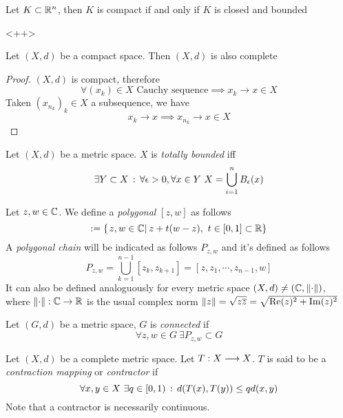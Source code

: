 \documentclass[../complete.tex]{subfiles}
\begin{document}
\begin{thm}
	Let $K\subset\mathbb{R}^n$, then $K$ is compact if and only if $K$ is closed and bounded
\end{thm}<++>
\begin{thm}
	Let $(X,d)$ be a compact space. Then $(X,d)$ is also complete
\end{thm}
\begin{proof}
	$(X,d)$ is compact, therefore
	\begin{equation*}
		\forall(x_k)\in X\text{ Cauchy sequence}\implies x_k\to x\in X
	\end{equation*}
	Taken $(x_{n_k})_k\in X$ a subsequence, we have
	\begin{equation*}
		x_{k}\to x\implies x_{n_k}\to x\in X
	\end{equation*}
\end{proof}
\begin{dfn}
	Let $(X,d)$ be a metric space. $X$ is \textit{totally bounded} iff
	\begin{equation*}
		\exists Y\subset X\st\forall\epsilon>0,\forall x\in Y\ X=\bigcup_{i=1}^nB_\epsilon(x)
	\end{equation*}
\end{dfn}
\begin{dfn}
	Let $z,w\in\mathbb{C}$. We define a \textit{polygonal} $[z,w]$ as follows
	\begin{equation*}
		[z,w]:=\{\derin{z,w\in\Cf}z+t(w-z),\ t\in[0,1]\subset\R\}
	\end{equation*}
	A \textit{polygonal chain} will be indicated as follows $P_{z,w}$ and it's defined as follows
	\begin{equation*}
		P_{z,w}=\bigcup_{k=1}^{n-1}[z_k,z_{k+1}]=[z,z_1,\cdots,z_{n-1},w]
	\end{equation*}
	It can also be defined analoguously for every metric space $(X,d)\ne(\mathbb{C},\norm{\cdot})$, where $\norm{\cdot}:\mathbb{C}\to\mathbb{R}$ is the usual complex norm $\norm{z}=\sqrt{z\overline{z}}=\sqrt{\Re(z)^2+\Im(z)^2}$
\end{dfn}
\begin{dfn}
	Let $(G,d)$ be a metric space, $G$ is \textit{connected} if
	\begin{equation*}
		\forall z,w\in G\ \exists P_{z,w}\subset G
	\end{equation*}
\end{dfn}
\begin{dfn}
	Let $(X,d)$ be a complete metric space. Let $T:X\overset{}{\longrightarrow} X$. $T$ is said to be a \textit{contraction mapping} or \textit{contractor} if
	\begin{equation}
		\forall x,y\in X\ \exists q\in[0,1)\, :\,  d(T(x),T(y))\le qd(x,y)
		\label{eq:contractor}
	\end{equation}
	Note that a contractor is necessarily continuous.
\end{dfn}
\end{document}
